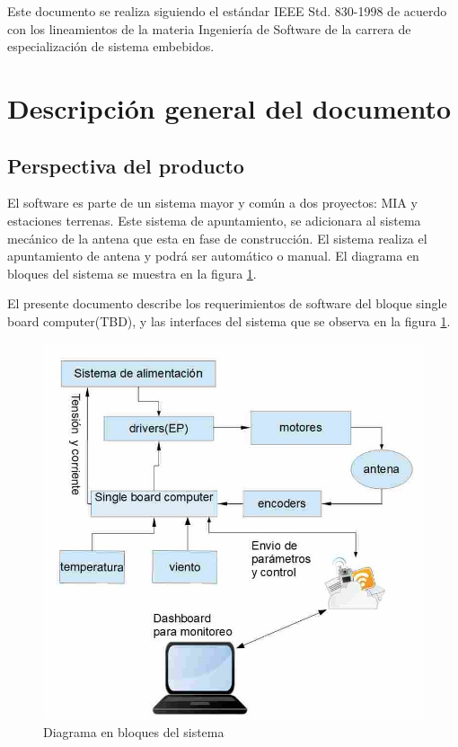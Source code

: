 \documentclass[12pt,a4paper, twosite]{article}
\begin{document}
	Este documento se realiza siguiendo el estándar IEEE Std. 830-1998 de acuerdo con los lineamientos de la 
	materia Ingeniería de Software de la carrera de especialización de sistema embebidos.
	
	
	\section{Descripción general del documento}
	\label{sec:orgc1c4017}
	
	\subsection{Perspectiva del producto}
	\label{sec:org24980a8}
	El software es parte de un sistema mayor y común a dos proyectos: MIA y estaciones terrenas. Este sistema de apuntamiento, se adicionara al sistema mecánico de la antena que esta en fase de construcción. El sistema realiza el apuntamiento de antena y podrá ser automático o manual. El diagrama en bloques del sistema se muestra en la figura \ref{fig:diagramaBloques}. 
	
	 El presente documento describe los requerimientos de software del bloque single board computer(TBD), y las interfaces del sistema que se observa en la figura  \ref{fig:diagramaBloques}. 
	\begin{figure}[h!]
		\centering
		\includegraphics[scale=0.5]{bloquesInt.jpg}
		\caption{Diagrama en bloques del sistema}
		\label{fig:diagramaBloques}
	\end{figure}
\end{document}
